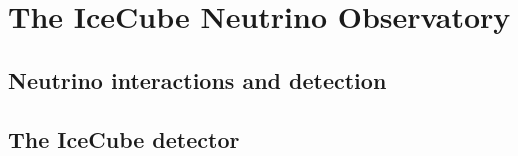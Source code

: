 \chapter{The IceCube Neutrino Observatory}

\section{Neutrino interactions and detection}

\section{The IceCube detector}

